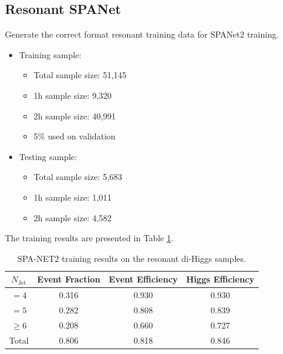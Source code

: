 \documentclass[12pt]{article}
\begin{document}
	\subsection{Resonant SPANet}%
	\label{sub:resonant_spanet}
		Generate the correct format resonant training data for SPANet2 training.
		\begin{itemize}
			\item Training sample:
			\begin{itemize}
				\item Total sample size: 51,145
				\item 1h sample size: 9,320
				\item 2h sample size: 40,991
				\item 5\% used on validation
			\end{itemize}
			\item Testing sample:
			\begin{itemize}
				\item Total sample size: 5,683
				\item 1h sample size: 1,011
				\item 2h sample size: 4,582
			\end{itemize}
		\end{itemize}
		The training results are presented in Table \ref{tab:SPANet2_diHiggs_4btag_DL1r_pt40_res}.
		\begin{table}[htpb]
			\centering
			\caption{SPA-NET2 training results on the resonant di-Higgs samples.}
			\label{tab:SPANet2_diHiggs_4btag_DL1r_pt40_res}
			\begin{tabular}{c|c|cc}
				$N_\text{Jet}$ & Event Fraction & Event Efficiency & Higgs Efficiency \\
				\hline
				$=4$	  &   0.316             &    0.930              &    0.930             \\
				$=5$	  &   0.282             &    0.808              &    0.839             \\
				$\ge 6$	  &   0.208             &    0.660              &    0.727             \\
				Total	  &   0.806             &    0.818              &    0.846             \\
			\end{tabular}
		\end{table}

\end{document}
